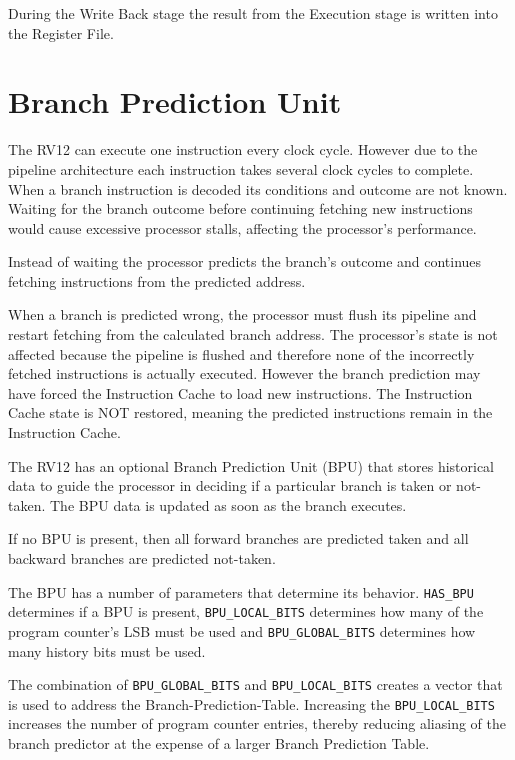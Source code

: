 During the Write Back stage the result from the Execution stage is written into the Register
File.

\section{Branch Prediction Unit} \label{branch-prediction-unit}

The RV12 can execute one instruction every clock cycle. However due to
the pipeline architecture each instruction takes several clock cycles to
complete. When a branch instruction is decoded its conditions and
outcome are not known. Waiting for the branch outcome before continuing
fetching new instructions would cause excessive processor stalls,
affecting the processor's performance.

Instead of waiting the processor predicts the branch's outcome and
continues fetching instructions from the predicted address.

When a branch is predicted wrong, the processor must flush its pipeline
and restart fetching from the calculated branch address. The processor's
state is not affected because the pipeline is flushed and therefore none
of the incorrectly fetched instructions is actually executed. However
the branch prediction may have forced the Instruction Cache to load new
instructions. The Instruction Cache state is NOT restored, meaning the
predicted instructions remain in the Instruction Cache.

The RV12 has an optional Branch Prediction Unit (BPU) that stores
historical data to guide the processor in deciding if a particular
branch is taken or not-taken. The BPU data is updated as soon as the
branch executes.

If no BPU is present, then all forward branches are predicted taken and
all backward branches are predicted not-taken.

The BPU has a number of parameters that determine its behavior. \texttt{HAS\_BPU}
determines if a BPU is present, \texttt{BPU\_LOCAL\_BITS} determines how many of
the program counter's LSB must be used and  \texttt{BPU\_GLOBAL\_BITS}  determines
how many history bits must be used.

The combination of \texttt{BPU\_GLOBAL\_BITS} and \texttt{BPU\_LOCAL\_BITS} creates a
vector that is used to address the Branch-Prediction-Table. Increasing
the \texttt{BPU\_LOCAL\_BITS} increases the number of program counter entries,
thereby reducing aliasing of the branch predictor at the expense of a
larger Branch Prediction Table.

